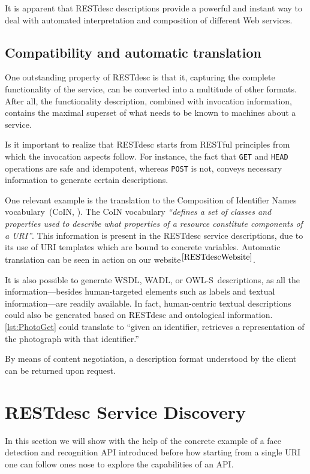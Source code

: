 \documentclass[runningheads,a4paper, twocolumn]{llncs}
\newcommand{\owls}{\mbox{OWL-S}}
\begin{document}
It is apparent that RESTdesc descriptions provide a powerful and instant way to deal with automated interpretation and composition of different Web services.


\subsection{Compatibility and automatic translation}
One outstanding property of RESTdesc is that it, capturing the complete functionality of the service, can be converted into a multitude of other formats. After all, the functionality description, combined with invocation information, contains the maximal superset of what needs to be known to machines about a service.

Is it important to realize that RESTdesc starts from RESTful principles from which the invocation aspects follow. For instance, the fact that \Verb!GET! and \Verb!HEAD! operations are safe and idempotent, whereas \Verb!POST! is not, conveys necessary information to generate certain descriptions.

One relevant example is the translation to the Composition of Identifier Names vocabulary~(CoIN, \cite{CoIN}). The CoIN vocabulary \emph{``defines a set of classes and properties used to describe what properties of a resource constitute components of a URI''}. This information is present in the RESTdesc service descriptions, due to its use of URI templates which are bound to concrete variables. Automatic translation can be seen in action on our website$^{\ref{RESTdescWebsite}}$.

It is also possible to generate WSDL, WADL, or \owls\ descriptions, as all the information---besides human-targeted elements such as labels and textual information---are readily available. In fact, human-centric textual descriptions could also be generated based on RESTdesc and ontological information. \autoref{lst:PhotoGet} could translate to ``given an identifier, retrieves a representation of the photograph with that identifier.''

By means of content negotiation, a description format understood by the client can be returned upon request.

\section{RESTdesc Service Discovery} \label{sec:restdesc-discovery}
In this section we will show with the help of the concrete example of a face detection and recognition API introduced before how starting from a single URI one can follow ones nose to explore the capabilities of an API.
\end{document}
